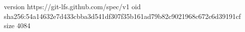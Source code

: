 version https://git-lfs.github.com/spec/v1
oid sha256:54a14632e7d433cbba3d541df307f35b161ad79b82c9021968c672c6d39191cf
size 4084
